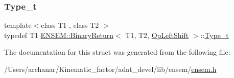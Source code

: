 \mbox{\label{structENSEM_1_1BinaryReturn_3_01T1_00_01T2_00_01OpLeftShift_01_4_a5b3c8cfdda3306ec2d9343185aba7e71}} 
\subsubsection{\texorpdfstring{Type\_t}{Type\_t}\hspace{0.1cm}{\footnotesize\ttfamily [2/2]}}
{\footnotesize\ttfamily template$<$class T1 , class T2 $>$ \\
typedef T1 \mbox{\hyperlink{structENSEM_1_1BinaryReturn}{E\+N\+S\+E\+M\+::\+Binary\+Return}}$<$ T1, T2, \mbox{\hyperlink{structENSEM_1_1OpLeftShift}{Op\+Left\+Shift}} $>$\+::\mbox{\hyperlink{structENSEM_1_1BinaryReturn_3_01T1_00_01T2_00_01OpLeftShift_01_4_a5b3c8cfdda3306ec2d9343185aba7e71}{Type\+\_\+t}}}



The documentation for this struct was generated from the following file\+:\begin{DoxyCompactItemize}
\item 
/\+Users/archanar/\+Kinematic\+\_\+factor/adat\+\_\+devel/lib/ensem/\mbox{\hyperlink{lib_2ensem_2ensem_8h}{ensem.\+h}}\end{DoxyCompactItemize}
